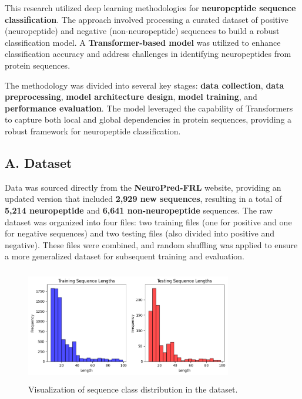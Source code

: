 \documentclass[conference]{IEEEtran}
\begin{document}
This research utilized deep learning methodologies for \textbf{neuropeptide sequence classification}. The approach involved processing a curated dataset of positive (neuropeptide) and negative (non-neuropeptide) sequences to build a robust classification model. A \textbf{Transformer-based model} was utilized to enhance classification accuracy and address challenges in identifying neuropeptides from protein sequences.

The methodology was divided into several key stages: \textbf{data collection}, \textbf{data preprocessing}, \textbf{model architecture design}, \textbf{model training}, and \textbf{performance evaluation}. The model leveraged the capability of Transformers to capture both local and global dependencies in protein sequences, providing a robust framework for neuropeptide classification.

\subsection*{A. Dataset}

Data was sourced directly from the \textbf{NeuroPred-FRL} website, providing an updated version that included \textbf{2,929 new sequences}, resulting in a total of \textbf{5,214 neuropeptide} and \textbf{6,641 non-neuropeptide} sequences. The raw dataset was organized into four files: two training files (one for positive and one for negative sequences) and two testing files (also divided into positive and negative). These files were combined, and random shuffling was applied to ensure a more generalized dataset for subsequent training and evaluation.

\vspace{-1em}

\begin{figure}[h]
    \centering
    \includegraphics[height = 5cm, width=9cm]{Images/1.png}
    \vspace{-1.6em}
    \caption{Visualization of sequence class distribution in the dataset.}
    \label{fig:seq_distribution}
\end{figure}
\end{document}
